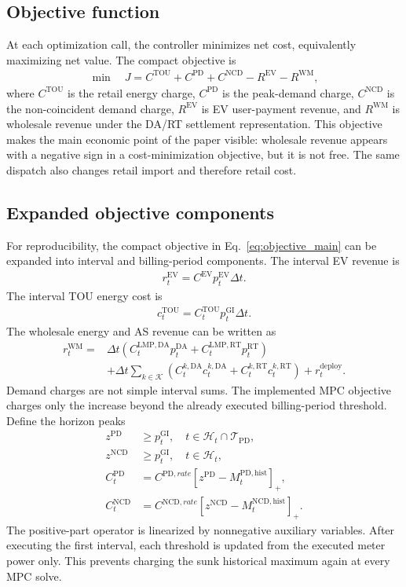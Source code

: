 \documentclass[final,5p,times]{elsarticle}
\newcommand{\DeltaT}{\Delta t}
\newcommand{\EV}{\mathrm{EV}}
\newcommand{\DA}{\mathrm{DA}}
\newcommand{\RT}{\mathrm{RT}}
\newcommand{\GI}{\mathrm{GI}}
\newcommand{\TOU}{\mathrm{TOU}}
\newcommand{\PD}{\mathrm{PD}}
\newcommand{\NCD}{\mathrm{NCD}}
\newcommand{\WM}{\mathrm{WM}}
\newcommand{\calH}{\mathcal{H}}
\newcommand{\calT}{\mathcal{T}}
\newcommand{\calK}{\mathcal{K}}
\newcommand{\pos}[1]{\left[#1\right]_+}
\begin{document}
\subsection{Objective function}
At each optimization call, the controller minimizes net cost, equivalently maximizing net value. The compact objective is
\begin{align}
\min \quad
J = C^{\TOU}+C^{\PD}+C^{\NCD}-R^{\EV}-R^{\WM},
\label{eq:objective_main}
\end{align}
where $C^{\TOU}$ is the retail energy charge, $C^{\PD}$ is the peak-demand charge, $C^{\NCD}$ is the non-coincident demand charge, $R^{\EV}$ is EV user-payment revenue, and $R^{\WM}$ is wholesale revenue under the DA/RT settlement representation. This objective makes the main economic point of the paper visible: wholesale revenue appears with a negative sign in a cost-minimization objective, but it is not free. The same dispatch also changes retail import and therefore retail cost.

\subsection{Expanded objective components}
For reproducibility, the compact objective in Eq.~\eqref{eq:objective_main} can be expanded into interval and billing-period components. The interval EV revenue is
\begin{align}
r_t^{\EV}=C^{\EV}p_t^{\EV}\DeltaT.
\label{eq:interval_ev_rev}
\end{align}
The interval TOU energy cost is
\begin{align}
c_t^{\TOU}=C_t^{\TOU}p_t^{\GI}\DeltaT.
\label{eq:interval_tou}
\end{align}
The wholesale energy and AS revenue can be written as
\begin{align}
r_t^{\WM}=&\DeltaT\left(C_t^{\mathrm{LMP},\DA}p_t^{\DA}+C_t^{\mathrm{LMP},\RT}p_t^{\RT}\right)\nonumber\\
&+\DeltaT\sum_{k\in\calK}\left(C_t^{k,\DA}c_t^{k,\DA}+C_t^{k,\RT}c_t^{k,\RT}\right)+r_t^{\mathrm{deploy}}.
\label{eq:interval_wm_rev}
\end{align}
Demand charges are not simple interval sums. The implemented MPC objective charges only the increase beyond the already executed billing-period threshold. Define the horizon peaks
\begin{align}
z^{\PD}&\ge p_t^{\GI},\quad t\in\calH_t\cap\calT_{\PD},\label{eq:pd_epigraph}\\
z^{\NCD}&\ge p_t^{\GI},\quad t\in\calH_t,\label{eq:ncd_epigraph}\\
C_t^{\PD}&=C^{\PD,rate}\pos{z^{\PD}-M_t^{\PD,\mathrm{hist}}},\nonumber\\
C_t^{\NCD}&=C^{\NCD,rate}\pos{z^{\NCD}-M_t^{\NCD,\mathrm{hist}}}.\label{eq:dem_epigraph_cost}
\end{align}
The positive-part operator is linearized by nonnegative auxiliary variables. After executing the first interval, each threshold is updated from the executed meter power only. This prevents charging the sunk historical maximum again at every MPC solve.
\end{document}
